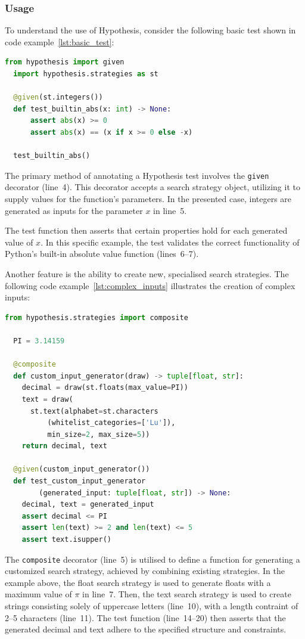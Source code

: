 \documentclass[runningheads]{llncs}
\begin{document}
\subsubsection{Usage}
To understand the use of Hypothesis, consider the following basic test shown in code example~\ref{lst:basic_test}:
\begin{lstlisting}[language=Python,caption={Basic Test from \texttt{tutorial.ipynb}},label=lst:basic_test]
  from hypothesis import given
  import hypothesis.strategies as st

  @given(st.integers())
  def test_builtin_abs(x: int) -> None:
      assert abs(x) >= 0
      assert abs(x) == (x if x >= 0 else -x)

  test_builtin_abs()
\end{lstlisting}
The primary method of annotating a Hypothesis test involves the \texttt{given} decorator (line~4). This decorator accepts a search strategy object, utilizing it to supply values for the function's parameters. In the presented case, integers are generated as inputs for the parameter $x$ in line~5.

The test function then asserts that certain properties hold for each generated value of $x$. In this specific example, the test validates the correct functionality of Python's built-in absolute value function (lines~6--7).

\vspace{5mm}
\noindent Another feature is the ability to create new, specialised search strategies. The following code example~\ref{lst:complex_inputs} illustrates the creation of complex inputs:

\begin{lstlisting}[language=Python,caption={Complex Inputs from \texttt{tutorial.ipynb}},label=lst:complex_inputs]
  from hypothesis.strategies import composite

  PI = 3.14159

  @composite
  def custom_input_generator(draw) -> tuple[float, str]:
    decimal = draw(st.floats(max_value=PI))
    text = draw(
      st.text(alphabet=st.characters
          (whitelist_categories=['Lu']),
          min_size=2, max_size=5))
    return decimal, text

  @given(custom_input_generator())
  def test_custom_input_generator
        (generated_input: tuple[float, str]) -> None:
    decimal, text = generated_input
    assert decimal <= PI
    assert len(text) >= 2 and len(text) <= 5
    assert text.isupper()
\end{lstlisting}
The \texttt{composite} decorator (line~5) is utilised to define a function for generating a customized search strategy, achieved by combining existing strategies. In the example above, the float search strategy is used to generate floats with a maximum value of $\pi$ in line~7. Then, the text search strategy is used to create strings consisting solely of uppercase letters (line~10), with a length contraint of 2--5 characters (line~11). The test function (line~14--20) then asserts that the generated decimal and text adhere to the specified structure and constraints.
\end{document}
